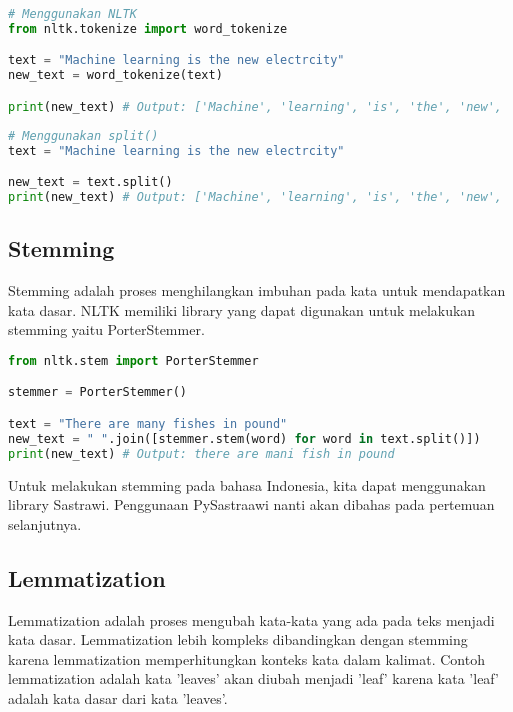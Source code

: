 \documentclass{article}
\begin{document}
    \begin{lstlisting}[language=python, style=pythonstyle]
# Menggunakan NLTK
from nltk.tokenize import word_tokenize

text = "Machine learning is the new electrcity"
new_text = word_tokenize(text)

print(new_text) # Output: ['Machine', 'learning', 'is', 'the', 'new', 'electricity']
    \end{lstlisting}

    \begin{lstlisting}[language=python, style=pythonstyle]
# Menggunakan split()
text = "Machine learning is the new electrcity"

new_text = text.split()
print(new_text) # Output: ['Machine', 'learning', 'is', 'the', 'new', 'electricity']
    \end{lstlisting}

    \subsection*{Stemming}

    Stemming adalah proses menghilangkan imbuhan pada kata untuk mendapatkan kata dasar.
    NLTK memiliki library yang dapat digunakan untuk melakukan stemming yaitu PorterStemmer.

    \begin{lstlisting}[language=python, style=pythonstyle]
from nltk.stem import PorterStemmer

stemmer = PorterStemmer()

text = "There are many fishes in pound"
new_text = " ".join([stemmer.stem(word) for word in text.split()])
print(new_text) # Output: there are mani fish in pound
    \end{lstlisting}

    Untuk melakukan stemming pada bahasa Indonesia, kita dapat menggunakan library Sastrawi.
    Penggunaan PySastraawi nanti akan dibahas pada pertemuan selanjutnya.

    \subsection*{Lemmatization}

    Lemmatization adalah proses mengubah kata-kata yang ada pada teks menjadi kata dasar.
    Lemmatization lebih kompleks dibandingkan dengan stemming karena lemmatization memperhitungkan konteks kata dalam kalimat.
    Contoh lemmatization adalah kata \@'leaves' akan diubah menjadi \@'leaf' karena kata \@'leaf' adalah kata dasar dari kata \@'leaves'.
\end{document}
